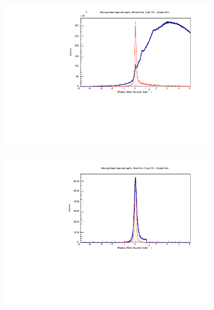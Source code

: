         \begin{figure}[!htb]
            \centering
            \begin{subfigure}{.45\textwidth}
                \centering
                \includegraphics[width=1\textwidth]{figures/Simulation/exclusivity/hist_missing_mass_squared_epX_prexcut_fd_Double.pdf}
            \end{subfigure}%
            \begin{subfigure}{.45\textwidth}
                \centering
                \includegraphics[width=1\textwidth]{figures/Simulation/exclusivity/hist_missing_mass_squared_epX_excut_fd_Double.pdf}
            \end{subfigure}
            \begin{subfigure}{.45\textwidth}
                \centering

\end{subfigure}
\end{figure}
